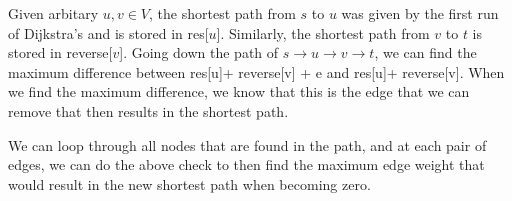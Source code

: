 \documentclass[12pt]{article}
\begin{document}
Given arbitary $u,v\in V$, the shortest path from $s$ to $u$ was given by the first run of Dijkstra's and is stored in res[$u$]. Similarly, the shortest path from $v$ to $t$ is stored in reverse[$v$]. Going down the path of $s \rightarrow u \rightarrow v \rightarrow t$, we can find the maximum difference between res[u]+ reverse[v] + e and res[u]+ reverse[v]. When we find  the maximum difference, we know that this is the edge that we can remove that then results in the shortest path. 

We can loop through all nodes that are found in the path, and at each pair of edges, we can do the above check to then find the maximum edge weight that would result in the new shortest path when becoming zero.
\end{document}

